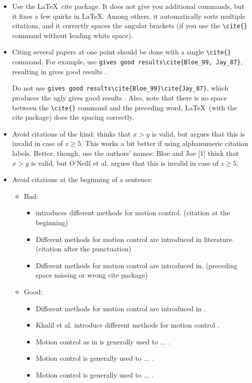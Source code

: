\begin{itemize}
\item Use the \LaTeX~cite package. It does not give you additional commands, but it fixes a few quirks in \LaTeX. Among others, it automatically sorts multiple citations, and it correctly spaces the angular brackets (if you use the \verb|\cite{}| command without leading white space).

\item Citing several papers at one point should be done with a single \verb|\cite{}| command. For example, use \verb|gives good results\cite{Bloe_99, Jay_87}|, resulting in gives good results \cite{Bloe_99, Jay_87}. 

Do not use \verb|gives good results\cite{Bloe_99}\cite{Jay_87}|, which produces the ugly gives good results \cite{Bloe_99}\cite{Jay_87}. Also, note that there is no space between the \verb|\cite{}| command and the preceding word, \LaTeX~(with the cite package) does the spacing correctly.

\item Avoid citations of the kind: \cite{Bloe_99} thinks that $x>y$ is valid, but \cite{ONeill_2000} argues that this is invalid in case of $z\geq5$. This works a bit better if using alphanumeric citation labels. Better, though, use the authors' names: Bloe and Joe [1] think that $x>y$ is valid, but O'Neill et al. \cite{ONeill_2000} argues that this is invalid in case of $z\geq5$. 

\item Avoid citations at the beginning of a sentence:
	\begin{itemize}
		\item Bad:
		\begin{itemize}
			\item \cite{Bloe_99} introduces different methods for motion control. (citation at the beginning)
			\item Different methods for motion control are introduced in literature. \cite{Bloe_99} (citation after the punctuation)
			\item Different methods for motion control are introduced in\cite{Bloe_99}. (preceding space missing or wrong cite package)
		\end{itemize}
		\item	Good: 	 
		\begin{itemize}
			\item Different methods for motion control are introduced in \cite{Bloe_99}.
			\item Khalil et al. introduce different methods for motion control \cite{Bloe_99}. 
			\item Motion control as in \cite{Bloe_99} is generally used to $\ldots$ .
			\item Motion control \cite{Bloe_99} is generally used to $\ldots$ .
			\item Motion control is generally used to $\ldots$ \cite{Bloe_99}.
		\end{itemize}
	\end{itemize}



\end{itemize}

